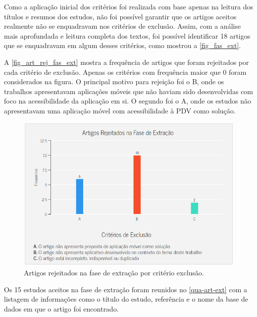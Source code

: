 Como a aplicação inicial dos critérios foi realizada com base apenas na leitura dos títulos e resumos dos estudos, não foi possível garantir que os artigos aceitos realmente não se enquadravam nos critérios de exclusão.
Assim, com a análise mais aprofundada e leitura completa dos textos, foi possível identificar 18 artigos que se enquadravam em algum desses critérios, como mostrou a \autoref{fig_fas_ext}.

\newpage

A \autoref{fig_art_rej_fas_ext} mostra a frequência de artigos que foram rejeitados por cada critério de exclusão.
Apenas os critérios com frequência maior que 0 foram considerados na figura.
O principal motivo para rejeição foi o B, onde os trabalhos apresentavam aplicações móveis que não haviam sido desenvolvidas com foco na acessibilidade da aplicação em si.
O segundo foi o A, onde os estudos não apresentavam uma aplicação móvel com acessibilidade à PDV como solução.

\begin{figure}[htb]
  \caption{\label{fig_art_rej_fas_ext}Artigos rejeitados na fase de extração por critério exclusão.}
  \begin{center}
    \includegraphics[scale=0.7]{Imagens/msl/artigos_rejeitados_fase_extracao.png}
  \end{center}
\end{figure}

Os 15 estudos aceitos na fase de extração foram reunidos no \autoref{qua-art-ext} com a listagem de informações como o título do estudo, referência e o nome da base de dados em que o artigo foi encontrado.

